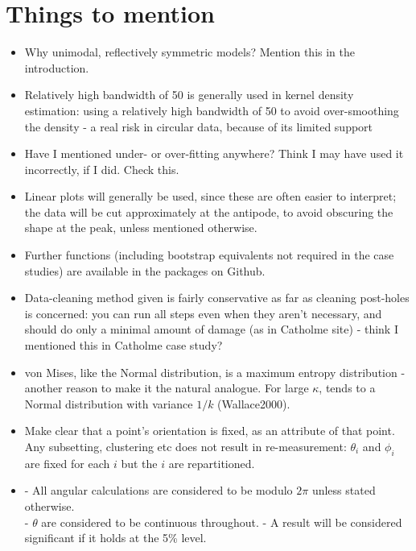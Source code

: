 \documentclass[10pt,fleqn]{article}
\numberwithin{equation}{section}
\numberwithin{figure}{section}
\numberwithin{table}{section}
\begin{document}
\section*{Things to mention}
\begin{itemize}

\item
Why unimodal, reflectively symmetric models? Mention this in the introduction.

\item
Relatively high bandwidth of 50 is generally used in kernel density estimation: using a relatively high bandwidth of 50 to avoid over-smoothing the density - a real risk in circular data, because of its limited support

\item
Have I mentioned under- or over-fitting anywhere? Think I may have used it incorrectly, if I did. Check this.

\item
Linear plots will generally be used, since these are often easier to interpret; the data will be cut approximately at the antipode, to avoid obscuring the shape at the peak, unless mentioned otherwise.

\item
Further functions (including bootstrap equivalents not required in the case studies) are available in the packages on Github.

\item
Data-cleaning method given is fairly conservative as far as cleaning post-holes is concerned: you can run all steps even when they aren't necessary, and should do only a minimal amount of damage (as in Catholme site) - think I mentioned this in Catholme case study?

\item
von Mises, like the Normal distribution, is a maximum entropy distribution - another reason to make it the natural analogue. For large $\kappa$, tends to a Normal distribution with variance $1/k$ (Wallace2000).

\item
Make clear that a point's orientation is fixed, as an attribute of that point. Any subsetting, clustering etc does not result in re-measurement: $\theta_i$ and $\phi_i$ are fixed for each $i$ but the $i$ are repartitioned.

\item
 - All angular calculations are considered to be modulo $2\pi$ unless stated otherwise.\\
 - $\theta$ are considered to be continuous throughout.
 - A result will be considered significant if it holds at the 5\% level.


\end{itemize}
\end{document}
